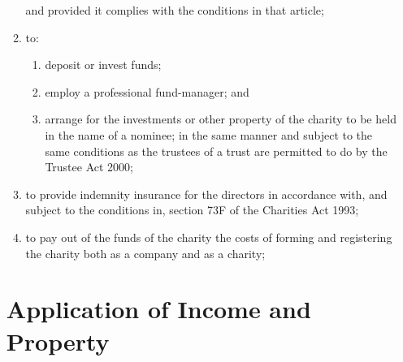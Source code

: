 \begin{enumerate}
\begin{enumerate}
    and provided it complies with the conditions in that article;
  \item
    to:
    \begin{enumerate}
    \item
      deposit or invest funds;
    \item
      employ a professional fund-manager; and
    \item
      arrange for the investments or other property of the charity to be
      held in the name of a nominee; in the same manner and subject to
      the same conditions as the trustees of a trust are permitted to do
      by the Trustee Act 2000;
    \end{enumerate}
  \item
    to provide indemnity insurance for the directors in accordance
    with, and subject to the conditions in, section 73F of the
    Charities Act 1993;
  \item
    to pay out of the funds of the charity the costs of forming and
    registering the charity both as a company and as a charity;
  \end{enumerate}

\section{Application of Income and Property}


\end{enumerate}
